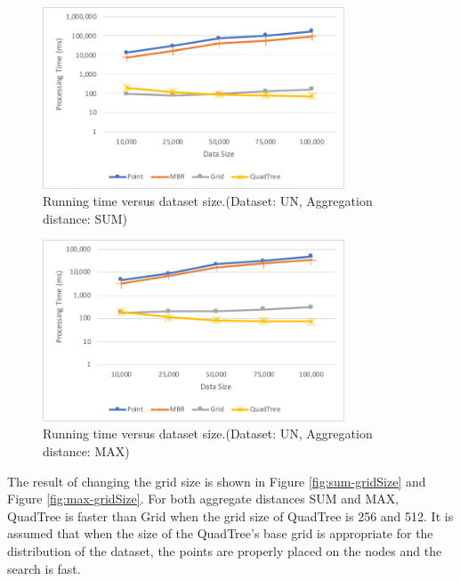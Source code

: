 \documentclass[a4paper,11pt]{report}
\theoremstyle{mytheoremstyle}
\begin{document}
\begin{figure}
    \begin{center}
        \includegraphics[width=0.8\textwidth]{src/images/UN-SUM.pdf}
    \end{center}
    \caption{Running time versus dataset size.(Dataset: UN, Aggregation distance: SUM)}
    \label{fig:sum-dataSize}
\end{figure}

\begin{figure}
    \begin{center}
        \includegraphics[width=0.8\textwidth]{src/images/UN-MAX.pdf}
    \end{center}
    \caption{Running time versus dataset size.(Dataset: UN, Aggregation distance: MAX)}
    \label{fig:max-dataSize}
\end{figure}

The result of changing the grid size is shown in Figure \ref{fig:sum-gridSize} and Figure \ref{fig:max-gridSize}. For both aggregate distances SUM and MAX, QuadTree is faster than Grid when the grid size of QuadTree is 256 and 512. It is assumed that when the size of the QuadTree's base grid is appropriate for the distribution of the dataset, the points are properly placed on the nodes and the search is fast.
\end{document}
